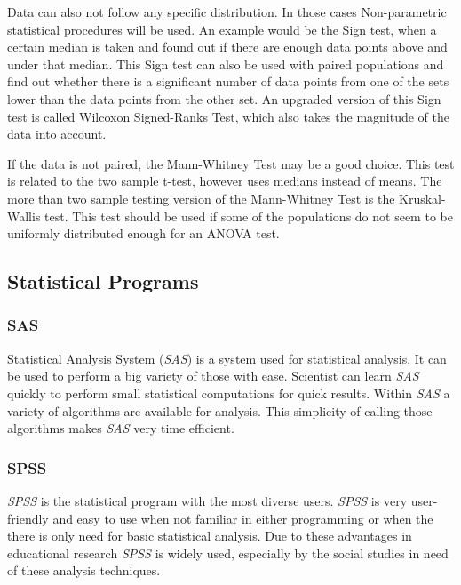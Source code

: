 \documentclass[10pt,a4paper]{report}
\begin{document}
	Data can also not follow any specific distribution. In those cases 
	Non-parametric statistical procedures will be used. An example would be the 
	Sign test, when a certain median is taken and found out if there are enough 
	data points above and under that median. This Sign test can also be used 
	with paired populations and find out whether there is a significant number 
	of data points from one of the sets lower than the data points from the 
	other set. An upgraded version of this Sign test is called Wilcoxon 
	Signed-Ranks Test, which also takes the magnitude of the data into 
	account. \cite{heiberger2004statistical}
	
	If the data is not paired, the Mann-Whitney Test may be a good choice. This	
	test is related to the two sample t-test, however uses medians instead of 
	means. The more than two sample testing version of the Mann-Whitney Test is 
	the Kruskal-Wallis test. This test should be used if some of the 
	populations do not seem to be uniformly distributed enough for an ANOVA 
	test. \cite{heiberger2004statistical}
	
	\clearpage
	
	\subsection{Statistical Programs}
	
	\subsubsection{SAS}
	
	Statistical Analysis System (\textit{SAS}) is a system used for statistical 
	analysis. It can be used to perform a big variety of those with ease. 
	Scientist can learn \textit{SAS} quickly to perform small statistical computations 
	for quick results. Within \textit{SAS} a variety of algorithms are available for 
	analysis. This simplicity of calling those algorithms makes \textit{SAS} very time 
	efficient.  \cite{o2013step}
	
	\subsubsection{SPSS}
	
	\textit{SPSS} is the statistical program with the most diverse users. \textit{SPSS} is very 
	user-friendly and easy to use when not familiar in either programming or 
	when the there is only need for basic statistical analysis. Due to these 
	advantages in educational research \textit{SPSS} is widely used, especially by the 
	social studies in need of these analysis techniques.  \cite{muijs2010doing}
	
\end{document}
